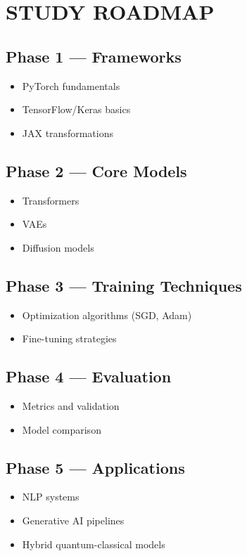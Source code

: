 \section*{STUDY ROADMAP}

\subsection*{Phase 1 --- Frameworks}
\begin{itemize}
\item PyTorch fundamentals
\item TensorFlow/Keras basics
\item JAX transformations
\end{itemize}

\subsection*{Phase 2 --- Core Models}
\begin{itemize}
\item Transformers
\item VAEs
\item Diffusion models
\end{itemize}

\subsection*{Phase 3 --- Training Techniques}
\begin{itemize}
\item Optimization algorithms (SGD, Adam)
\item Fine-tuning strategies
\end{itemize}

\subsection*{Phase 4 --- Evaluation}
\begin{itemize}
\item Metrics and validation
\item Model comparison
\end{itemize}

\subsection*{Phase 5 --- Applications}
\begin{itemize}
\item NLP systems
\item Generative AI pipelines
\item Hybrid quantum-classical models
\end{itemize}